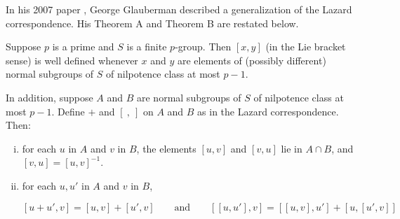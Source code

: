 \documentclass{ucetd}
\begin{document}
In his 2007 paper \cite{Partialextensions}, George Glauberman described
a generalization of the Lazard correspondence. His Theorem A and
Theorem B are restated below.

\begin{theorem}
  Suppose $p$ is a prime and $S$ is a finite $p$-group. Then $[x,y]$
  (in the Lie bracket sense) is well defined whenever $x$ and $y$ are
  elements of (possibly different) normal subgroups of $S$ of
  nilpotence class at most $p - 1$.

  In addition, suppose $A$ and $B$ are normal subgroups of $S$ of
  nilpotence class at most $p - 1$. Define $+$ and $[ \ , \ ]$ on $A$
  and $B$ as in the Lazard correspondence. Then:

  \begin{enumerate}[(i)]
  \item for each $u$ in $A$ and $v$ in $B$, the elements $[u,v]$ and
    $[v,u]$ lie in $A \cap B$, and $[v,u] = [u,v]^{-1}$.
  \item for each $u,u'$ in $A$ and $v$ in $B$,

    $$[u + u',v] = [u,v] + [u',v] \qquad \text{and} \qquad [[u,u'],v] = [[u,v],u'] + [u,[u',v]]$$
  \end{enumerate}
\end{theorem}
\end{document}
